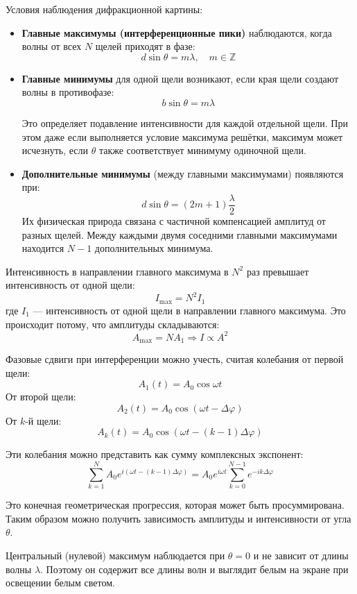 \documentclass[12pt]{article}
\begin{document}
Условия наблюдения дифракционной картины:
\begin{itemize}
    \item \textbf{Главные максимумы (интерференционные пики)} наблюдаются, когда волны от всех $N$ щелей приходят в фазе:
    \[
    d \sin \theta = m \lambda, \quad m \in \mathbb{Z}
    \]
    
    \item \textbf{Главные минимумы} для одной щели возникают, если края щели создают волны в противофазе:
    \[
    b \sin \theta = m \lambda
    \]
    
    Это определяет подавление интенсивности для каждой отдельной щели. При этом даже если выполняется условие максимума решётки, максимум может исчезнуть, если $\theta$ также соответствует минимуму одиночной щели.

    \item \textbf{Дополнительные минимумы} (между главными максимумами) появляются при:
    \[
    d \sin \theta = \left(2m + 1\right) \frac{\lambda}{2}
    \]
    Их физическая природа связана с частичной компенсацией амплитуд от разных щелей. Между каждыми двумя соседними главными максимумами находится $N - 1$ дополнительных минимума.
\end{itemize}

Интенсивность в направлении главного максимума в $N^2$ раз превышает интенсивность от одной щели:
\[
I_{\max} = N^2 I_1
\]
где $I_1$ — интенсивность от одной щели в направлении главного максимума. Это происходит потому, что амплитуды складываются:
\[
A_{\max} = N A_1
\Rightarrow I \propto A^2
\]

Фазовые сдвиги при интерференции можно учесть, считая колебания от первой щели:
\[
A_1(t) = A_0 \cos \omega t
\]
От второй щели:
\[
A_2(t) = A_0 \cos(\omega t - \Delta \varphi)
\]
От $k$-й щели:
\[
A_k(t) = A_0 \cos\left(\omega t - (k - 1)\Delta \varphi\right)
\]

Эти колебания можно представить как сумму комплексных экспонент:
\[
\sum_{k=1}^N A_0 e^{i(\omega t - (k - 1)\Delta \varphi)} = A_0 e^{i\omega t} \sum_{k=0}^{N-1} e^{-i k \Delta \varphi}
\]

Это конечная геометрическая прогрессия, которая может быть просуммирована. Таким образом можно получить зависимость амплитуды и интенсивности от угла $\theta$.

Центральный (нулевой) максимум наблюдается при $\theta = 0$ и не зависит от длины волны $\lambda$. Поэтому он содержит все длины волн и выглядит белым на экране при освещении белым светом.
\end{document}
